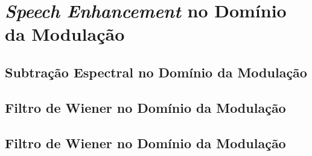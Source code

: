 \section{\textit{Speech Enhancement} no Domínio da Modulação}
\subsection{Subtração Espectral no Domínio da Modulação}
\subsection{Filtro de Wiener no Domínio da Modulação}
\subsection{Filtro de Wiener no Domínio da Modulação}
